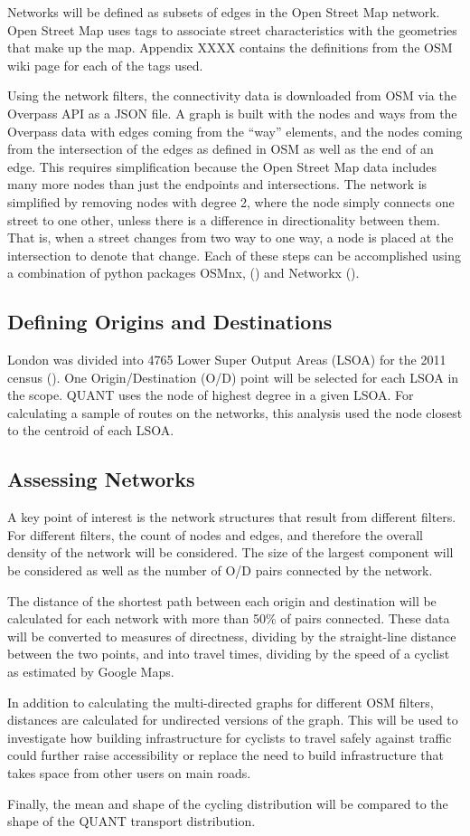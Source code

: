 Networks will be defined as subsets of edges in the Open Street Map network. Open Street Map uses tags to associate street characteristics with the geometries that make up the map. Appendix XXXX contains the definitions from the OSM wiki page for each of the tags used.  

Using the network filters, the connectivity data is downloaded from OSM via the Overpass API as a JSON file. A graph is built with the nodes and ways from the Overpass data with edges coming from the ``way'' elements, and the nodes coming from the intersection of the edges as defined in OSM as well as the end of an edge. This requires simplification because the Open Street Map data includes many more nodes than just the endpoints and intersections. The network is simplified by removing nodes with degree 2, where the node simply connects one street to one other, unless there is a difference in directionality between them. That is, when a street changes from two way to one way, a node is placed at the intersection to denote that change.  Each of these steps can be accomplished using a combination of python packages OSMnx, (\cite{osmnx}) and Networkx (\cite{networkx}).

\subsection{Defining Origins and Destinations}
London was divided into 4765 Lower Super Output Areas (LSOA) for the 2011 census (\cite{lsoa}). One Origin/Destination (O/D) point will be selected for each LSOA in the scope. QUANT uses the node of highest degree in a given LSOA. For calculating a sample of routes on the networks, this analysis used the node closest to the centroid of each LSOA. 

\subsection{Assessing Networks}

A key point of interest is the network structures that result from different filters. For different filters, the count of nodes and edges, and therefore the overall density of the network will be considered. The size of the largest component will be considered as well as the number of O/D pairs connected by the network. 

The distance of the shortest path between each origin and destination will be calculated for each network with more than 50\% of pairs connected. These data will be converted to measures of directness, dividing by the straight-line distance between the two points, and into travel times, dividing by the speed of a cyclist as estimated by Google Maps. 

In addition to calculating the multi-directed graphs for different OSM filters, distances are calculated for undirected versions of the graph. This will be used to investigate how building infrastructure for cyclists to travel safely against traffic could further raise accessibility or replace the need to build infrastructure that takes space from other users on main roads. 

Finally, the mean and shape of the cycling distribution will be compared to the shape of the QUANT transport distribution.  

